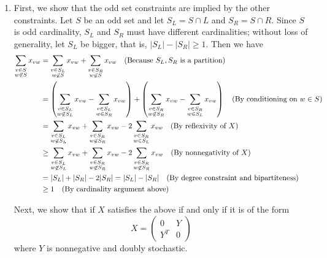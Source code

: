 \documentclass{hmcpset}
\begin{document}
\begin{solution}
\begin{enumerate}[label=(\Alph*)]
\item
First, we show that the odd set constraints are implied by the other constraints. Let $S$ be an odd set and let $S_L = S \cap L$ and $S_R = S \cap R$. Since $S$ is odd cardinality, $S_L$ and $S_R$ must have different cardinalities; without loss of generality, let $S_L$ be bigger, that is, $|S_L| - |S_R| \geq 1$. Then we have
\begin{align*}
\sum_{\substack{v \in S \\ w \not \in S}} x_{vw} &= \sum_{\substack{v \in S_L \\ w \not \in S}} x_{vw} + \sum_{\substack{v \in S_R \\ w \not \in S}} x_{vw} \text{\quad(Because $S_L,S_R$ is a partition)} \\
&= \left (\sum_{\substack{v \in S_L \\ w \not \in S_L}} x_{vw} - \sum_{\substack{v \in S_L \\ w \in S_R}} x_{vw}\right ) + \left (\sum_{\substack{v \in S_R \\ w \not \in S_R}} x_{vw} - \sum_{\substack{v \in S_R \\ w \in S_L}} x_{vw}\right ) \text{\quad (By conditioning on $w\in S$)} \\
&= \sum_{\substack{v \in S_L \\ w \not \in S_L}} x_{vw} + \sum_{\substack{v \in S_R \\ w \not \in S_R}} x_{vw} - 2\sum_{\substack{v \in S_R \\ w \in S_L}} x_{vw} \text{\quad (By reflexivity of $X$)}\\
&\geq \sum_{\substack{v \in S_L \\ w \not \in S_L}} x_{vw} + \sum_{\substack{v \in S_R \\ w \not \in S_R}} x_{vw} - 2\sum_{\substack{v \in S_R \\ w \not \in S_R}} x_{vw} \text {\quad (By nonnegativity of $X$)}\\
& = |S_L| + |S_R| - 2|S_R| = |S_L|-|S_R| \text{\quad (By degree constraint and bipartiteness)}\\
& \geq 1 \text {\quad (By cardinality argument above)}
\end{align*}

Next, we show that if $X$ satisfies the above if and only if it is of the form 
\[ X = \begin{pmatrix} 0 & Y \\ Y^T & 0\end{pmatrix} \]
where $Y$ is nonnegative and doubly stochastic.


\end{enumerate}
\end{solution}
\end{document}
